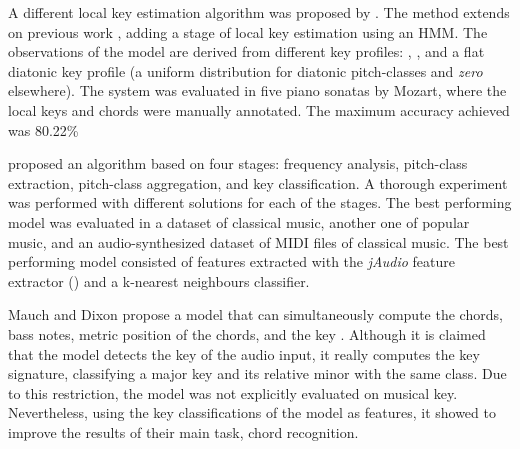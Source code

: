 A different local key estimation algorithm was proposed by
\textcite{papadopoulos2009local}. The method extends on
previous work \parencite{papadopoulos2008simultaneous},
adding a stage of local key estimation using an HMM. The
observations of the model are derived from different key
profiles: \textcite{krumhansl1982tracing},
\textcite{temperley1999whats}, and a flat diatonic key
profile (a uniform distribution for diatonic pitch-classes
and \emph{zero} elsewhere). The system was evaluated in five
piano sonatas by Mozart, where the local keys and chords
were manually annotated. The maximum accuracy achieved was
80.22\%

\textcite{campbell2010automatic} proposed an algorithm based
on four stages: frequency analysis, pitch-class extraction,
pitch-class aggregation, and key classification. A thorough
experiment was performed with different solutions for each
of the stages. The best performing model was evaluated in a
dataset of classical music, another one of popular music,
and an audio-synthesized dataset of MIDI files of classical
music. The best performing model consisted of features
extracted with the \emph{jAudio} feature extractor
(\parencite{mcennis2005jaudio}) and a k-nearest neighbours
classifier.

Mauch and Dixon propose a model that can simultaneously
compute the chords, bass notes, metric position of the
chords, and the key \textcite{mauch2010simultaneous}.
Although it is claimed that the model detects the key of the
audio input, it really computes the key signature,
classifying a major key and its relative minor with the same
class. Due to this restriction, the model was not explicitly
evaluated on musical key. Nevertheless, using the key
classifications of the model as features, it showed to
improve the results of their main task, chord recognition.










